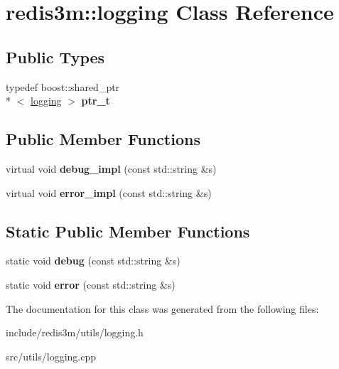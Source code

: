 \hypertarget{classredis3m_1_1logging}{\section{redis3m\-:\-:logging Class Reference}
\label{classredis3m_1_1logging}
}
\subsection*{Public Types}
\begin{DoxyCompactItemize}
\item 
\hypertarget{classredis3m_1_1logging_a155a3f862eb82e16a5af2decbf7237dd}{typedef boost\-::shared\-\_\-ptr\\*
$<$ \hyperlink{classredis3m_1_1logging}{logging} $>$ {\bfseries ptr\-\_\-t}}\label{classredis3m_1_1logging_a155a3f862eb82e16a5af2decbf7237dd}

\end{DoxyCompactItemize}
\subsection*{Public Member Functions}
\begin{DoxyCompactItemize}
\item 
\hypertarget{classredis3m_1_1logging_acca48cb20905358d5c137c56e49cfa8a}{virtual void {\bfseries debug\-\_\-impl} (const std\-::string \&s)}\label{classredis3m_1_1logging_acca48cb20905358d5c137c56e49cfa8a}

\item 
\hypertarget{classredis3m_1_1logging_a8cdb2eb07f644cf0abf298a525302be6}{virtual void {\bfseries error\-\_\-impl} (const std\-::string \&s)}\label{classredis3m_1_1logging_a8cdb2eb07f644cf0abf298a525302be6}

\end{DoxyCompactItemize}
\subsection*{Static Public Member Functions}
\begin{DoxyCompactItemize}
\item 
\hypertarget{classredis3m_1_1logging_a11dad7e613bad53fa01c0d199707944d}{static void {\bfseries debug} (const std\-::string \&s)}\label{classredis3m_1_1logging_a11dad7e613bad53fa01c0d199707944d}

\item 
\hypertarget{classredis3m_1_1logging_a4535e3c0f6299a8d8f233adc5ffa7651}{static void {\bfseries error} (const std\-::string \&s)}\label{classredis3m_1_1logging_a4535e3c0f6299a8d8f233adc5ffa7651}

\end{DoxyCompactItemize}


The documentation for this class was generated from the following files\-:\begin{DoxyCompactItemize}
\item 
include/redis3m/utils/logging.\-h\item 
src/utils/logging.\-cpp\end{DoxyCompactItemize}
